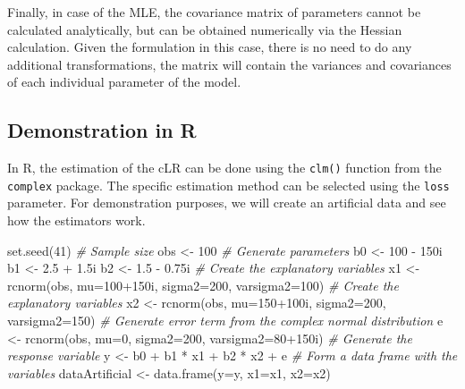 \documentclass[
]{book}
\newenvironment{Shaded}{\begin{snugshade}}{\end{snugshade}}
\newcommand{\AttributeTok}[1]{\textcolor[rgb]{0.77,0.63,0.00}{#1}}
\newcommand{\CommentTok}[1]{\textcolor[rgb]{0.56,0.35,0.01}{\textit{#1}}}
\newcommand{\DecValTok}[1]{\textcolor[rgb]{0.00,0.00,0.81}{#1}}
\newcommand{\FloatTok}[1]{\textcolor[rgb]{0.00,0.00,0.81}{#1}}
\newcommand{\FunctionTok}[1]{\textcolor[rgb]{0.00,0.00,0.00}{#1}}
\newcommand{\NormalTok}[1]{#1}
\newcommand{\OtherTok}[1]{\textcolor[rgb]{0.56,0.35,0.01}{#1}}
\newcommand{\SpecialCharTok}[1]{\textcolor[rgb]{0.00,0.00,0.00}{#1}}
\begin{document}
Finally, in case of the MLE, the covariance matrix of parameters cannot be calculated analytically, but can be obtained numerically via the Hessian calculation. Given the formulation in this case, there is no need to do any additional transformations, the matrix will contain the variances and covariances of each individual parameter of the model.

\hypertarget{demonstration-in-r}{%
\subsection{Demonstration in R}\label{demonstration-in-r}}

In R, the estimation of the cLR can be done using the \texttt{clm()} function from the \texttt{complex} package. The specific estimation method can be selected using the \texttt{loss} parameter. For demonstration purposes, we will create an artificial data and see how the estimators work.

\begin{Shaded}
\begin{Highlighting}[]
\FunctionTok{set.seed}\NormalTok{(}\DecValTok{41}\NormalTok{)}
\CommentTok{\# Sample size}
\NormalTok{obs }\OtherTok{\textless{}{-}} \DecValTok{100}
\CommentTok{\# Generate parameters}
\NormalTok{b0 }\OtherTok{\textless{}{-}} \DecValTok{100} \SpecialCharTok{{-}}\NormalTok{ 150i}
\NormalTok{b1 }\OtherTok{\textless{}{-}} \FloatTok{2.5} \SpecialCharTok{+} \FloatTok{1.5}\NormalTok{i}
\NormalTok{b2 }\OtherTok{\textless{}{-}} \FloatTok{1.5} \SpecialCharTok{{-}} \FloatTok{0.75}\NormalTok{i}
\CommentTok{\# Create the explanatory variables}
\NormalTok{x1 }\OtherTok{\textless{}{-}} \FunctionTok{rcnorm}\NormalTok{(obs, }\AttributeTok{mu=}\DecValTok{100}\SpecialCharTok{+}\NormalTok{150i, }\AttributeTok{sigma2=}\DecValTok{200}\NormalTok{, }\AttributeTok{varsigma2=}\DecValTok{100}\NormalTok{)}
\CommentTok{\# Create the explanatory variables}
\NormalTok{x2 }\OtherTok{\textless{}{-}} \FunctionTok{rcnorm}\NormalTok{(obs, }\AttributeTok{mu=}\DecValTok{150}\SpecialCharTok{+}\NormalTok{100i, }\AttributeTok{sigma2=}\DecValTok{200}\NormalTok{, }\AttributeTok{varsigma2=}\DecValTok{150}\NormalTok{)}
\CommentTok{\# Generate error term from the complex normal distribution}
\NormalTok{e }\OtherTok{\textless{}{-}} \FunctionTok{rcnorm}\NormalTok{(obs, }\AttributeTok{mu=}\DecValTok{0}\NormalTok{, }\AttributeTok{sigma2=}\DecValTok{200}\NormalTok{, }\AttributeTok{varsigma2=}\DecValTok{80}\SpecialCharTok{+}\NormalTok{150i)}
\CommentTok{\# Generate the response variable}
\NormalTok{y }\OtherTok{\textless{}{-}}\NormalTok{ b0 }\SpecialCharTok{+}\NormalTok{ b1 }\SpecialCharTok{*}\NormalTok{ x1 }\SpecialCharTok{+}\NormalTok{ b2 }\SpecialCharTok{*}\NormalTok{ x2 }\SpecialCharTok{+}\NormalTok{ e}
\CommentTok{\# Form a data frame with the variables}
\NormalTok{dataArtificial }\OtherTok{\textless{}{-}} \FunctionTok{data.frame}\NormalTok{(}\AttributeTok{y=}\NormalTok{y, }\AttributeTok{x1=}\NormalTok{x1, }\AttributeTok{x2=}\NormalTok{x2)}
\end{Highlighting}
\end{Shaded}
\end{document}
